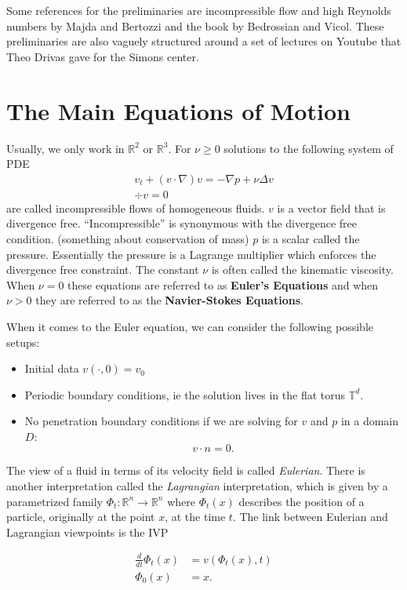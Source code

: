 Some references for the preliminaries are incompressible flow and high Reynolds numbers by Majda and Bertozzi and the book by Bedrossian and Vicol. These preliminaries are also vaguely structured around a set of lectures on Youtube that Theo Drivas gave for the Simons center.


\section{The Main Equations of Motion}
Usually, we only work in $\mathbb{R}^2$ or $\mathbb{R}^3$. For $\nu \geq 0$ solutions to the following system of PDE
\begin{gather}
    v_t + (v \cdot \nabla)v = -\nabla p + \nu \Delta v \\
    \div v = 0
\end{gather}
are called incompressible flows of homogeneous fluids. $v$ is a vector field that is divergence free. ``Incompressible'' is synonymous with the divergence free condition. (something about conservation of mass) $p$ is a scalar called the pressure. Essentially the pressure is a Lagrange multiplier which enforces the divergence free constraint. The constant $\nu$ is often called the kinematic viscosity. When $\nu = 0$ these equations are referred to as \textbf{Euler's Equations} and when $\nu > 0$ they are referred to as the \textbf{Navier-Stokes Equations}.

When it comes to the Euler equation, we can consider the following possible setups:
\begin{itemize}
    \item Initial data $v(\cdot, 0) = v_0$
    \item Periodic boundary conditions, ie the solution lives in the flat torus $\mathbb{T}^d$.
    \item No penetration boundary conditions if we are solving for $v$ and $p$ in a domain $D$:
    \[v \cdot n = 0.\]
\end{itemize}

The view of a fluid in terms of its velocity field is called \textit{Eulerian}. There is another interpretation called the \textit{Lagrangian} interpretation, which is given by a parametrized family $\Phi_t: \mathbb{R}^n \to \mathbb{R}^n$ where $\Phi_t(x)$ describes the position of a particle, originally at the point $x$, at the time $t$. The link between Eulerian and Lagrangian viewpoints is the IVP

\[ 
\begin{aligned}
\frac{d}{dt}\Phi_t(x) &= v(\Phi_t(x), t) \\
\Phi_0(x) &= x.
\end{aligned}
\]

